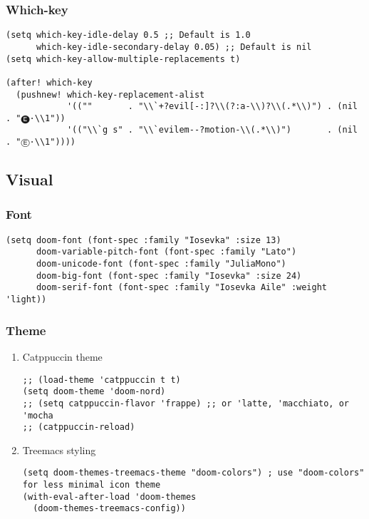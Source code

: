 \documentclass[c]{article}
\theoremstyle{plain}%
\theoremstyle{definition}
\theoremstyle{remark}
\begin{document}
\subsubsection{Which-key}
\label{sec:orgd9137e9}
\begin{verbatim}
(setq which-key-idle-delay 0.5 ;; Default is 1.0
      which-key-idle-secondary-delay 0.05) ;; Default is nil
(setq which-key-allow-multiple-replacements t)

(after! which-key
  (pushnew! which-key-replacement-alist
            '((""       . "\\`+?evil[-:]?\\(?:a-\\)?\\(.*\\)") . (nil . "🅔·\\1"))
            '(("\\`g s" . "\\`evilem--?motion-\\(.*\\)")       . (nil . "Ⓔ·\\1"))))
\end{verbatim}
\subsection{Visual}
\label{sec:orge95738d}
\subsubsection{Font}
\label{sec:org7cf1e72}
\begin{verbatim}
(setq doom-font (font-spec :family "Iosevka" :size 13)
      doom-variable-pitch-font (font-spec :family "Lato")
      doom-unicode-font (font-spec :family "JuliaMono")
      doom-big-font (font-spec :family "Iosevka" :size 24)
      doom-serif-font (font-spec :family "Iosevka Aile" :weight 'light))
\end{verbatim}
\subsubsection{Theme}
\label{sec:orgbaeebbf}
\begin{enumerate}
\item Catppuccin theme
\label{sec:org3cd5618}
\begin{verbatim}
;; (load-theme 'catppuccin t t)
(setq doom-theme 'doom-nord)
;; (setq catppuccin-flavor 'frappe) ;; or 'latte, 'macchiato, or 'mocha
;; (catppuccin-reload)
\end{verbatim}
\item Treemacs styling
\label{sec:orgd650630}
\begin{verbatim}
(setq doom-themes-treemacs-theme "doom-colors") ; use "doom-colors" for less minimal icon theme
(with-eval-after-load 'doom-themes
  (doom-themes-treemacs-config))
\end{verbatim}
\end{enumerate}
\end{document}
